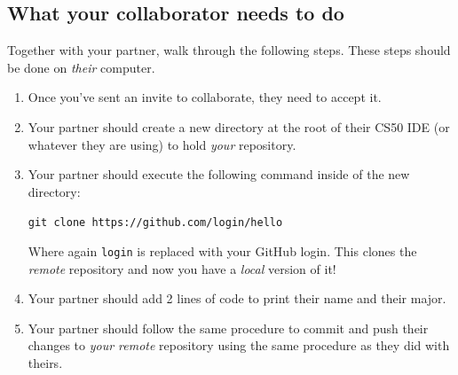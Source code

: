 \documentclass[12pt]{scrartcl}
\begin{document}
\subsection{What your collaborator needs to do}

Together with your partner, walk through the following steps.  These
steps should be done on \emph{their} computer.

\begin{enumerate}
  \item Once you've sent an invite to collaborate, they need to 
  accept it.
  \item Your partner should create a new directory at the root of
  their CS50 IDE (or whatever they are using) to hold \emph{your}
  repository.
  \item Your partner should execute the following command inside
  of the new directory:
  
  \texttt{git clone https://github.com/login/hello}
  
  Where again \texttt{login} is replaced with your
  GitHub login.  This clones the \emph{remote} repository and now you have a 
  \emph{local} version of it!

  \item Your partner should add 2 lines of code to 
  print their name and their major.
  
  \item Your partner should follow the same procedure to commit 
  and push their changes to \emph{your remote} repository using 
  the same procedure as they did with theirs.
  

\end{enumerate}
\end{document}
